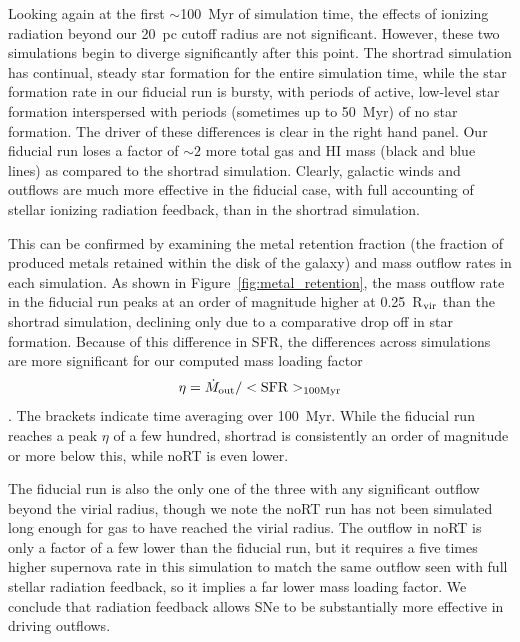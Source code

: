 \documentclass[twocolumn]{aastex62}
\begin{document}
Looking again at the first $\sim$100~Myr of simulation time, the effects of ionizing radiation beyond our 20~pc cutoff radius are not significant. However, these two simulations begin to diverge significantly after this point. The shortrad simulation has continual, steady star formation for the entire simulation time, while the star formation rate in our fiducial run is bursty, with periods of active, low-level star formation interspersed with periods (sometimes up to 50~Myr) of no star formation. The driver of these differences is clear in the right hand panel. Our fiducial run loses a factor of $\sim 2$ more total gas and HI mass (black and blue lines) as compared to the shortrad simulation. Clearly, galactic winds and outflows are much more effective in the fiducial case, with full accounting of stellar ionizing radiation feedback, than in the shortrad simulation.

This can be confirmed by examining the metal retention fraction (the fraction of produced metals retained within the disk of the galaxy) and mass outflow rates in each simulation. As shown in Figure~\ref{fig:metal_retention}, the mass outflow rate in the fiducial run peaks at an order of magnitude higher at 0.25~R$_{\rm vir}$ than the shortrad simulation, declining only due to a comparative drop off in star formation. Because of this difference in SFR, 
the differences across simulations are more significant for our computed mass loading factor 
\begin{equation}
    \eta = \dot{M}_{\rm out} / <\rm{SFR}>_{100 \rm{Myr}}
\end{equation}. The brackets indicate time averaging over 100~Myr.
%
While the fiducial run reaches a peak $\eta$ of a few hundred, shortrad is consistently an order of magnitude or more below this, while noRT is even lower. 

The fiducial run is also the only one of the three with any significant outflow beyond the virial radius, though we note the noRT run has not been simulated long enough for gas to have reached the virial radius. The outflow in noRT is 
   only a factor of a few lower than 
the fiducial run, but it requires a five times higher supernova rate in this simulation to match the same outflow seen with full stellar radiation feedback, 
    so it implies a far lower mass loading factor. 
We conclude that radiation feedback allows SNe to be substantially more effective in driving outflows. 
\end{document}
